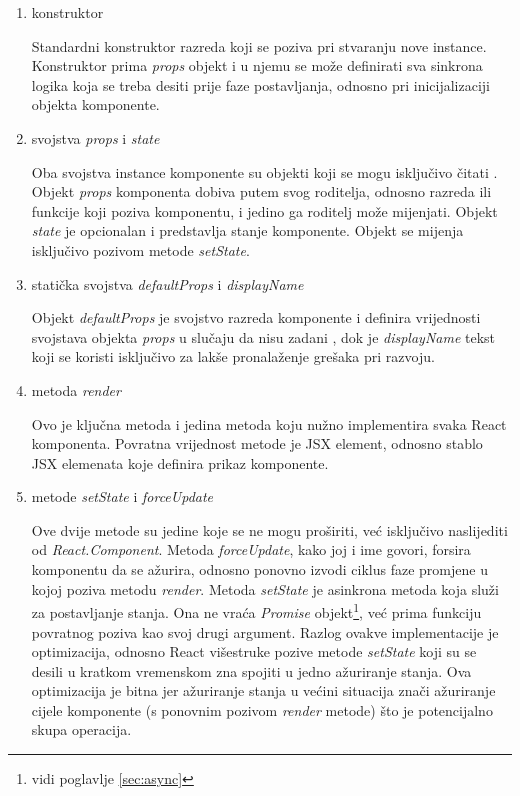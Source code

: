 \documentclass[times, utf8, diplomski, numeric]{fer}
\begin{document}
\begin{enumerate}[label=(\alph*)]

    \item konstruktor
    
    Standardni konstruktor razreda koji se poziva pri stvaranju nove instance. Konstruktor prima \emph{props} objekt i u njemu se može definirati sva sinkrona logika koja se treba desiti prije faze postavljanja, odnosno pri inicijalizaciji objekta komponente.

    \item svojstva \emph{props} i \emph{state}
    
    Oba svojstva instance komponente su objekti koji se mogu isključivo čitati .
    Objekt \emph{props} komponenta dobiva putem svog roditelja, odnosno razreda ili funkcije koji poziva komponentu, i jedino ga roditelj može mijenjati.
    Objekt \emph{state} je opcionalan i predstavlja stanje komponente. Objekt se mijenja isključivo pozivom metode \emph{setState}.

    \item statička svojstva \emph{defaultProps} i \emph{displayName}
    
    Objekt \emph{defaultProps} je svojstvo razreda komponente i definira vrijednosti svojstava objekta \emph{props} u slučaju da nisu zadani , dok je \emph{displayName} tekst koji se koristi isključivo za lakše pronalaženje grešaka pri razvoju.

    \item metoda \emph{render}
    
    Ovo je ključna metoda i jedina metoda koju nužno implementira svaka React komponenta. Povratna vrijednost metode je JSX element, odnosno stablo JSX elemenata koje definira prikaz komponente.

    \item metode \emph{setState} i \emph{forceUpdate}
    
    Ove dvije metode su jedine koje se ne mogu proširiti, već isključivo naslijediti od \emph{React.Component}.
    Metoda \emph{forceUpdate}, kako joj i ime govori, forsira komponentu da se ažurira, odnosno ponovno izvodi ciklus faze promjene u kojoj poziva metodu \emph{render}.
    Metoda \emph{setState} je asinkrona metoda koja služi za postavljanje stanja.
    Ona ne vraća \emph{Promise} objekt\footnote{vidi poglavlje \ref{sec:async}}, već prima funkciju povratnog poziva kao svoj drugi argument.
    Razlog ovakve implementacije je optimizacija, odnosno React višestruke pozive metode \emph{setState} koji su se desili u kratkom vremenskom zna spojiti u jedno ažuriranje stanja.
    Ova optimizacija je bitna jer ažuriranje stanja u većini situacija znači ažuriranje cijele komponente (s ponovnim pozivom \emph{render} metode) što je potencijalno skupa operacija.


\end{enumerate}
\end{document}
